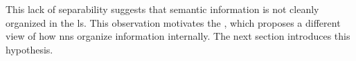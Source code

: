 This lack of separability suggests that semantic information is not cleanly organized in the \gls{ls}.
This observation motivates the \SuperpositionHypothesisName, which proposes a different view of how \glspl{nn} organize information internally.
The next section introduces this hypothesis.


